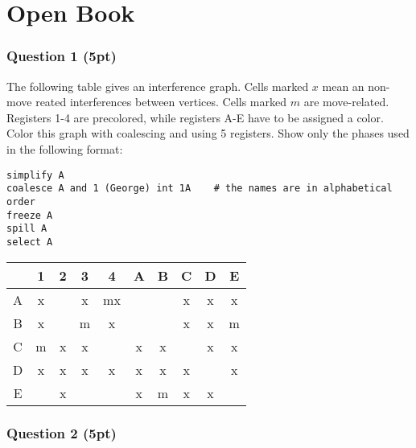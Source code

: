 \documentclass{report}
\begin{document}
\part{Open Book}
\section*{Question 1 (5pt)}
The following table gives an interference graph. Cells marked $x$ mean an non-move reated interferences between vertices. Cells marked $m$ are move-related. Registers 1-4 are precolored, while registers A-E have to be assigned a color. Color this graph with coalescing and using 5 registers. Show only the phases used in the following format:
\begin{lstlisting}
simplify A
coalesce A and 1 (George) int 1A    # the names are in alphabetical order
freeze A
spill A
select A
\end{lstlisting}
\begin{table}[ht]
    \centering
    \begin{tabular}{c | c c c c c c c c c}
            & 1 & 2 & 3 & 4 & A & B & C & D & E \\
            \hline
        A   & x &   & x &mx &   &   & x & x &  x \\
        B   & x &   & m & x &   &   & x & x & m \\
        C   & m & x & x &   & x & x &   & x & x \\
        D   & x & x & x & x & x & x & x &   & x \\
        E   &   & x  &  &  &  x & m  & x & x &   \\
    \end{tabular}
\end{table}

\section*{Question 2 (5pt)}
\end{document}
